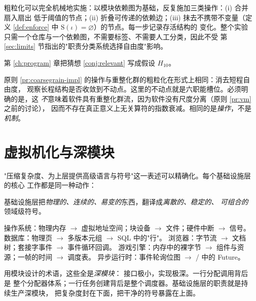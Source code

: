 \begin{principle}[实施形式]\label{pr:coarsegrain-impl}
粗粒化可以完全机械地实施：以模块依赖图为基础，反复施加三类操作：(i) 合并扇入扇出
低于阈值的节点；(ii) 折叠可传递的依赖边；(iii) 抹去不携带不变量（定义
\ref{def:enforce} 中 $\mathrm{S}(\iota) = \varnothing$）的节点。每一步记录存活结构的
变化。整个实验只需一个仓库与一个依赖图，不需要标签、不需要人工分类，因此不受
第 \ref{sec:limits} 节指出的"职责分类系统选择自由度"影响。
\end{principle}

第 \ref{ch:program} 章把猜想 \ref{conj:relevant} 写成假设 $H_{10}$。

\begin{remark}[与重整化的关系]\label{rmk:rg}
原则 \ref{pr:coarsegrain-impl} 的操作与重整化群的粗粒化在形式上相同：消去短程自由度，
观察长程结构是否收敛到不动点。这里的不动点就是六职能槽位。必须明确的是，这
\emph{不}意味着软件具有重整化群流，因为软件没有尺度分离（原则 \ref{pr:vm} 之前的讨论），
因而不存在真正意义上无关算符的指数衰减。相同的是\emph{操作}，不是\emph{机制}。
\end{remark}

\section{虚拟机化与深模块}\label{sec:virtualisation}

"压缩复杂度、为上层提供高级语言与符号"这一表述可以精确化。每个基础设施层的核心
工作都是同一种动作：

\begin{principle}[虚拟机化]\label{pr:vm}
基础设施层把\emph{物理的、连续的、易变的}东西，翻译成\emph{离散的、稳定的、
可组合的}领域级符号。
\end{principle}

\begin{example}\label{ex:vm}
操作系统：物理内存 $\to$ 虚拟地址空间；块设备 $\to$ 文件；硬件中断 $\to$ 信号。
数据库：物理页 $\to$ 多版本元组 $\to$ SQL 中的"行"。
浏览器：字节流 $\to$ 文档树；套接字事件 $\to$ 事件循环回调。
游戏引擎：内存中的裸字节 $\to$ 组件与资源；一帧的时间 $\to$ 调度表。
异步运行时：事件轮询位图 $\to$ / 中的 Future。
\end{example}

用模块设计的术语\cite{parnas1972,ousterhout2018}，这些全是\emph{深模块}：
接口极小，实现极深。一行分配调用背后是
整个分配器体系；一行任务创建背后是整个调度器。基础设施层的职责就是持续生产深模块，
把复杂度封在下面，把干净的符号暴露在上面。

